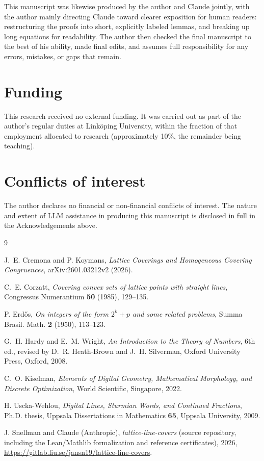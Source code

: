 \documentclass[a4paper,11pt,oneside,reqno]{amsart}
\theoremstyle{definition}
\theoremstyle{remark}
\theoremstyle{plain}
\begin{document}
This manuscript was likewise produced by the author and Claude jointly, with the author mainly
directing Claude toward clearer exposition for human readers: restructuring the proofs into short,
explicitly labeled lemmas, and breaking up long equations for readability. The author then checked
the final manuscript to the best of his ability, made final edits, and assumes full responsibility
for any errors, mistakes, or gaps that remain.

\section*{Funding}

This research received no external funding. It was carried out as part of the author's regular
duties at Link\"oping University, within the fraction of that employment allocated to research
(approximately 10\%, the remainder being teaching).

\section*{Conflicts of interest}

The author declares no financial or non-financial conflicts of interest. The nature and extent of
LLM assistance in producing this manuscript is disclosed in full in the Acknowledgements above.

\begin{thebibliography}{9}

J.~E. Cremona and P. Koymans, \emph{Lattice Coverings and Homogeneous Covering Congruences},
arXiv:2601.03212v2 (2026).

C.~E. Corzatt, \emph{Covering convex sets of lattice points with straight lines}, Congressus
Numerantium \textbf{50} (1985), 129--135.

P. Erd\H{o}s, \emph{On integers of the form \(2^k+p\) and some related problems}, Summa Brasil.
Math. \textbf{2} (1950), 113--123.

G.~H. Hardy and E.~M. Wright, \emph{An Introduction to the Theory of Numbers}, 6th ed., revised
by D.~R. Heath-Brown and J.~H. Silverman, Oxford University Press, Oxford, 2008.

C.~O. Kiselman, \emph{Elements of Digital Geometry, Mathematical Morphology, and Discrete
Optimization}, World Scientific, Singapore, 2022.

H. Uscka-Wehlou, \emph{Digital Lines, Sturmian Words, and Continued Fractions}, Ph.D. thesis,
Uppsala Dissertations in Mathematics \textbf{65}, Uppsala University, 2009.

J. Snellman and Claude (Anthropic), \emph{lattice-line-covers} (source repository, including the
Lean/Mathlib formalization and reference certificates), 2026,
\url{https://gitlab.liu.se/jansn19/lattice-line-covers}.

\end{thebibliography}
\end{document}
